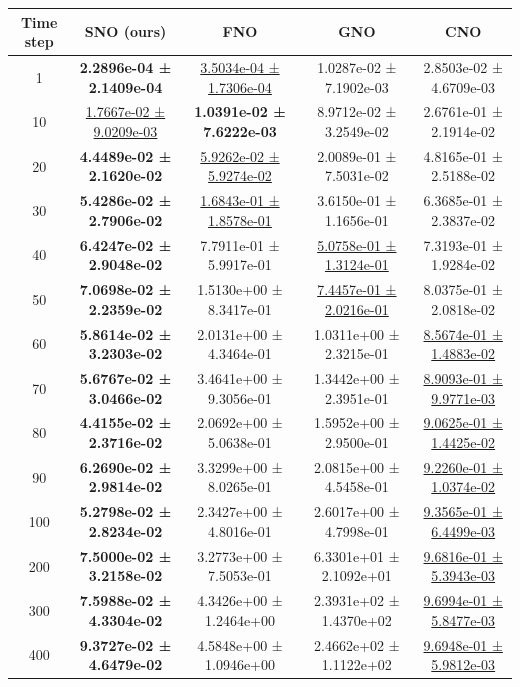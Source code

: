 \documentclass{article}
\theoremstyle{plain}
\theoremstyle{definition}
\theoremstyle{remark}
\begin{document}
\begin{table}[htbp]
\centering
\small
\setlength{\tabcolsep}{6pt}
\begin{tabular}{ccccc}
\hline
Time step & SNO (ours) & FNO & GNO & CNO \\
\hline
1   & \textbf{2.2896e-04 ± 2.1409e-04} & \underline{3.5034e-04 ± 1.7306e-04} & 1.0287e-02 ± 7.1902e-03 & 2.8503e-02 ± 4.6709e-03 \\
10  & \underline{1.7667e-02 ± 9.0209e-03} & \textbf{1.0391e-02 ± 7.6222e-03} & 8.9712e-02 ± 3.2549e-02 & 2.6761e-01 ± 2.1914e-02 \\
20  & \textbf{4.4489e-02 ± 2.1620e-02} & \underline{5.9262e-02 ± 5.9274e-02} & 2.0089e-01 ± 7.5031e-02 & 4.8165e-01 ± 2.5188e-02 \\
30  & \textbf{5.4286e-02 ± 2.7906e-02} & \underline{1.6843e-01 ± 1.8578e-01} & 3.6150e-01 ± 1.1656e-01 & 6.3685e-01 ± 2.3837e-02 \\
40  & \textbf{6.4247e-02 ± 2.9048e-02} & 7.7911e-01 ± 5.9917e-01 & \underline{5.0758e-01 ± 1.3124e-01} & 7.3193e-01 ± 1.9284e-02 \\
50  & \textbf{7.0698e-02 ± 2.2359e-02} & 1.5130e+00 ± 8.3417e-01 & \underline{7.4457e-01 ± 2.0216e-01} & 8.0375e-01 ± 2.0818e-02 \\
60  & \textbf{5.8614e-02 ± 3.2303e-02} & 2.0131e+00 ± 4.3464e-01 & 1.0311e+00 ± 2.3215e-01 & \underline{8.5674e-01 ± 1.4883e-02} \\
70  & \textbf{5.6767e-02 ± 3.0466e-02} & 3.4641e+00 ± 9.3056e-01 & 1.3442e+00 ± 2.3951e-01 & \underline{8.9093e-01 ± 9.9771e-03} \\
80  & \textbf{4.4155e-02 ± 2.3716e-02} & 2.0692e+00 ± 5.0638e-01 & 1.5952e+00 ± 2.9500e-01 & \underline{9.0625e-01 ± 1.4425e-02} \\
90  & \textbf{6.2690e-02 ± 2.9814e-02} & 3.3299e+00 ± 8.0265e-01 & 2.0815e+00 ± 4.5458e-01 & \underline{9.2260e-01 ± 1.0374e-02} \\
100 & \textbf{5.2798e-02 ± 2.8234e-02} & 2.3427e+00 ± 4.8016e-01 & 2.6017e+00 ± 4.7998e-01 & \underline{9.3565e-01 ± 6.4499e-03} \\
200 & \textbf{7.5000e-02 ± 3.2158e-02} & 3.2773e+00 ± 7.5053e-01 & 6.3301e+01 ± 2.1092e+01 & \underline{9.6816e-01 ± 5.3943e-03} \\
300 & \textbf{7.5988e-02 ± 4.3304e-02} & 4.3426e+00 ± 1.2464e+00 & 2.3931e+02 ± 1.4370e+02 & \underline{9.6994e-01 ± 5.8477e-03} \\
400 & \textbf{9.3727e-02 ± 4.6479e-02} & 4.5848e+00 ± 1.0946e+00 & 2.4662e+02 ± 1.1122e+02 & \underline{9.6948e-01 ± 5.9812e-03} \\

\end{tabular}
\end{table}
\end{document}
